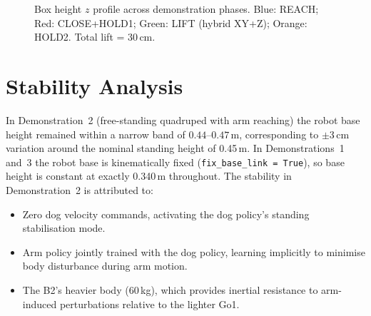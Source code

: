 \begin{figure}[htbp]
  \centering
  \caption{Box height $z$ profile across demonstration phases.
           Blue: REACH; Red: CLOSE+HOLD1; Green: LIFT (hybrid XY+Z);
           Orange: HOLD2.  Total lift = 30\,cm.}
  \label{fig:lift_height}
\end{figure}

\section{Stability Analysis}

In Demonstration~2 (free-standing quadruped with arm reaching) the robot
base height remained within a narrow band of $0.44$--$0.47$\,m, corresponding
to $\pm$3\,cm variation around the nominal standing height of 0.45\,m.
In Demonstrations~1 and~3 the robot base is kinematically fixed
(\texttt{fix\_base\_link = True}), so base height is constant at exactly
0.340\,m throughout.
The stability in Demonstration~2 is attributed to:
\begin{itemize}
  \item Zero dog velocity commands, activating the dog policy's standing
        stabilisation mode.
  \item Arm policy jointly trained with the dog policy, learning implicitly
        to minimise body disturbance during arm motion.
  \item The B2's heavier body (60\,kg), which provides inertial resistance
        to arm-induced perturbations relative to the lighter Go1.
\end{itemize}

